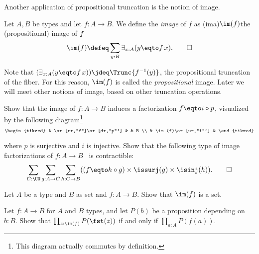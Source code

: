 Another application of propositional truncation
is the notion of image.
\begin{definition}\label{def:prop-image}
  Let $A,B$ be types and let $f : A \to B$. We define the \emph{image} of $f$ as
  \glossary(ima){$\protect\im(f)$}{the (propositional) image of $\protect f$}
  \[
    \im(f) \defeq \sum_{y:B}\exists_{x:A}(y \eqto f\,x).\qedhere
  \]
\end{definition}

Note that $(\exists_{x:A}(y \eqto f\,x)) \jdeq \Trunc{f^{-1}(y)}$,
the propositional truncation of the fiber.
For this reason, $\im(f)$ is called the \emph{propositional} image.
Later we will meet other notions of image, based on other truncation operations.

\begin{xca}\label{xca:unique-fact-image}
  Show that the image of $f : A \to B$ induces a factorization
  $f \eqto i\circ p$, visualized by the following diagram\footnote{%
  This diagram actually commutes by definition.}
  \[
    \begin{tikzcd}
      A \ar[rr,"f"]\ar[dr,"p"'] & & B \\
      & \im(f)\ar[ur,"i"'] &
    \end{tikzcd}
  \]

  where $p$ is surjective and $i$ is injective. Show that the
  following type of image factorizations of $f : A \to B$~ 
  is contractible:
  \[
  \sum_{C:\UU}\sum_{g:A\to C}\sum_{h: C\to B}
  ((f \eqto h\circ g) \times \issurj(g) \times \isinj(h)).\qedhere
  \]
\end{xca}

\begin{xca}\label{xca:prop-image-is-set}
Let $A$ be a type and $B$ as set and $f:A\to B$.
Show that $\im(f)$ is a set.
\end{xca}

\begin{xca}\label{xca:all-prop-image}
Let $f:A\to B$ for $A$ and $B$ types, and let $P(b)$ be a proposition
depending on $b:B$.
Show that $\prod_{z:\im(f)} P(\fst(z))$ if and only if $\prod_{a:A} P(f(a))$.
\end{xca}



